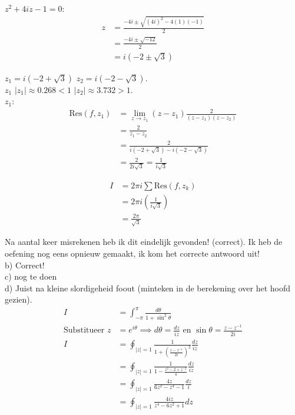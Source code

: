 \documentclass[a4paper,twoside]{article}
\theoremstyle{definition}
\theoremstyle{plain}
\begin{document}
 $z^2 + 4iz - 1 = 0$:
\begin{align*}
z &= \frac{-4i \pm \sqrt{(4i)^2 - 4(1)(-1)}}{2} \\
&= \frac{-4i \pm \sqrt{-12}}{2} \\
&= i(-2 \pm \sqrt{3})
\end{align*}

 $z_1 = i(-2+\sqrt{3})$  $z_2 = i(-2-\sqrt{3})$. \\
 $z_1$  $|z_1| \approx 0.268 < 1$  $|z_2| \approx 3.732 > 1$. \\

 $z_1$:
\begin{align*}
\text{Res}(f, z_1) &= \lim_{z \to z_1} (z - z_1) \frac{2}{(z-z_1)(z-z_2)} \\
&= \frac{2}{z_1 - z_2} \\
&= \frac{2}{i(-2+\sqrt{3}) - i(-2-\sqrt{3})} \\
&= \frac{2}{2i\sqrt{3}} = \frac{1}{i\sqrt{3}}
\end{align*}

\begin{align*}
I &= 2\pi i \sum \text{Res}(f, z_k) \\
&= 2\pi i \left( \frac{1}{i\sqrt{3}} \right) \\
&= \frac{2\pi}{\sqrt{3}}
\end{align*}

Na aantal keer misrekenen heb ik dit eindelijk gevonden! (correct). Ik heb de oefening nog eens opnieuw gemaakt, ik kom het correcte antwoord uit!\\
b) Correct!\\
c) nog te doen\\
d)
Juist na kleine slordigeheid foout (minteken in de berekening over het hoofd gezien).\\
\begin{align*}
I &= \int_{-\pi}^{\pi} \frac{d\theta}{1 + \sin^2 \theta} \\
\text{Substitueer } z &= e^{i\theta} \implies d\theta = \frac{dz}{iz} \text{ en } \sin \theta = \frac{z - z^{-1}}{2i} \\
I &= \oint_{|z|=1} \frac{1}{1 + \left(\frac{z - z^{-1}}{2i}\right)^2} \frac{dz}{iz} \\
&= \oint_{|z|=1} \frac{1}{1 - \frac{z^2 - 2 + z^{-2}}{4}} \frac{dz}{iz} \\
&= \oint_{|z|=1} \frac{4z}{6z^2 - z^4 - 1} \frac{dz}{i} \\
&= \oint_{|z|=1} \frac{4iz}{z^4 - 6z^2 + 1} dz
\end{align*}
\end{document}
